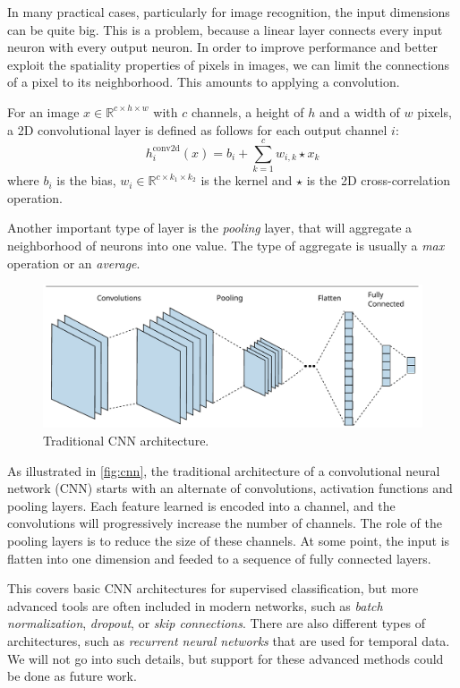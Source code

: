 \documentclass[a4paper,11pt,oneside]{report}
\begin{document}
In many practical cases, particularly for image recognition, the input dimensions can be quite big. 
This is a problem, because a linear layer connects every input neuron with every output neuron. 
In order to improve performance and better exploit the spatiality properties of pixels in images, we can limit the connections of a pixel to its neighborhood. 
This amounts to applying a convolution.

For an image $x \in \mathbb{R}^{c \times h \times w}$ with $c$ channels, a height of $h$ and a width of $w$ pixels, a 2D convolutional layer is defined as follows for each output channel $i$:
\begin{equation}\label{eq:conv2d_layer}
    h_i^{\mathrm{conv2d}}(x) = b_i + \sum_{k=1}^{c} w_{i, k} \star x_{k}
\end{equation}
where $b_i$ is the bias, $w_i \in \mathbb{R}^{c \times k_1 \times k_2}$ is the kernel and $\star$ is the 2D cross-correlation operation.

Another important type of layer is the \emph{pooling} layer, that will aggregate a neighborhood of neurons into one value. 
The type of aggregate is usually a \emph{max} operation or an \emph{average}.

\begin{figure}[h]
  \centering
  \includegraphics[width=\textwidth]{figures/cnn.pdf}
  \caption{Traditional CNN architecture.}
  \label{fig:cnn}
\end{figure}

As illustrated in \autoref{fig:cnn}, the traditional architecture of a convolutional neural network (CNN) starts with an alternate of convolutions, activation functions and pooling layers. 
Each feature learned is encoded into a channel, and the convolutions will progressively increase the number of channels.
The role of the pooling layers is to reduce the size of these channels.
At some point, the input is flatten into one dimension and feeded to a sequence of fully connected layers.

This covers basic CNN architectures for supervised classification, but more advanced tools are often included in modern networks, such as \emph{batch normalization}, \emph{dropout}, or \emph{skip connections}.
There are also different types of architectures, such as \emph{recurrent neural networks} that are used for temporal data.
We will not go into such details, but support for these advanced methods could be done as future work.
\end{document}
